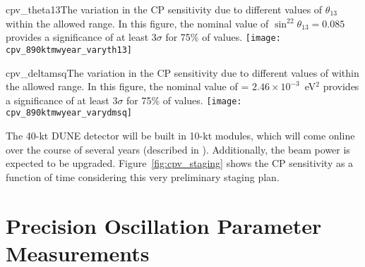 \begin{cdrfigure}{cpv_theta13}{The variation in the CP sensitivity due to different values of $\theta_{13}$ within the allowed range.  In this figure, the nominal value of $\sin^22\theta_{13} = 0.085$ provides a significance of at least 3$\sigma$ for 75\% of \deltacp values.}
 \texttt{[image: cpv\_890ktmwyear\_varyth13]}
\end{cdrfigure}

\begin{cdrfigure}{cpv_deltamsq}{The variation in the CP sensitivity due to different values of  within the allowed range.  In this figure, the nominal value of  = $2.46\times 10^{-3}$~eV$^2$ provides a significance of at least 3$\sigma$ for 75\% of \deltacp values.}
 \texttt{[image: cpv\_890ktmwyear\_varydmsq]}
\end{cdrfigure}

The 40-kt DUNE detector will be built in 10-kt modules, which will come online over the course of several years (described in \voldune).  Additionally, the beam power is expected to be upgraded. Figure~\ref{fig:cpv_staging} shows the CP sensitivity as a function of time considering this very preliminary staging plan. 


\section{Precision Oscillation Parameter Measurements}

